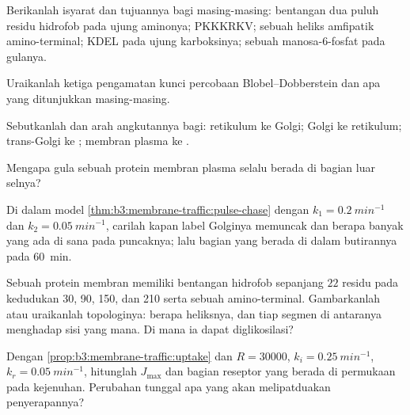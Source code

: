 \begin{exercise}[$\star$]\label{exo:b3:membrane-traffic:1}
Berikanlah isyarat dan tujuannya bagi masing-masing: bentangan dua puluh
residu hidrofob pada ujung aminonya; PKKKRKV; sebuah heliks amfipatik
amino-terminal; KDEL pada ujung karboksinya; sebuah
manosa-6-fosfat pada gulanya.
\end{exercise}

\begin{exercise}[$\star$]\label{exo:b3:membrane-traffic:2}
Uraikanlah ketiga pengamatan kunci percobaan Blobel--Dobberstein
dan apa yang ditunjukkan masing-masing.
\end{exercise}

\begin{exercise}[$\star$]\label{exo:b3:membrane-traffic:3}
Sebutkanlah  dan arah angkutannya bagi: retikulum ke Golgi;
Golgi ke retikulum; trans-Golgi ke ; membran plasma ke
.
\end{exercise}

\begin{exercise}[$\star$]\label{exo:b3:membrane-traffic:4}
Mengapa gula sebuah protein membran plasma selalu berada di bagian luar
selnya?
\end{exercise}

\begin{exercise}[$\star\star$]\label{exo:b3:membrane-traffic:5}
Di dalam model \cref{thm:b3:membrane-traffic:pulse-chase} dengan $k_{1}
= \qty{0.2}{min^{-1}}$ dan $k_{2} = \qty{0.05}{min^{-1}}$, carilah kapan
label Golginya memuncak dan berapa banyak yang ada di sana pada puncaknya;
lalu bagian yang berada di dalam butirannya pada \qty{60}{min}.
\end{exercise}

\begin{exercise}[$\star\star$]\label{exo:b3:membrane-traffic:6}
Sebuah protein membran memiliki bentangan hidrofob sepanjang $22$ residu pada
kedudukan 30, 90, 150, dan 210 serta sebuah  amino-terminal.
Gambarkanlah atau uraikanlah topologinya: berapa heliksnya, dan tiap segmen di
antaranya menghadap sisi yang mana. Di mana ia dapat diglikosilasi?
\end{exercise}

\begin{exercise}[$\star\star$]\label{exo:b3:membrane-traffic:7}
Dengan \cref{prop:b3:membrane-traffic:uptake} dan $R = \num{30000}$,
$k_{i} = \qty{0.25}{min^{-1}}$, $k_{r} = \qty{0.05}{min^{-1}}$, hitunglah
$J_{\max}$ dan bagian reseptor yang berada di permukaan pada kejenuhan.
Perubahan tunggal apa yang akan melipatduakan penyerapannya?
\end{exercise}

